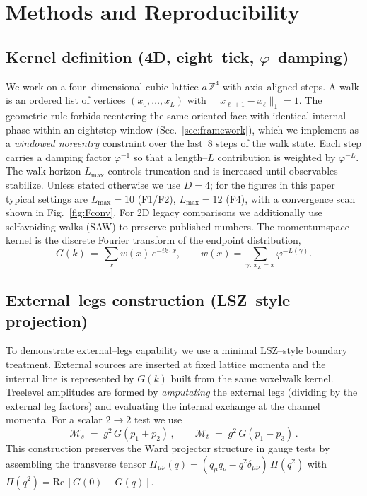 \documentclass[11pt,a4paper]{article}
\theoremstyle{definition}
\theoremstyle{remark}
\begin{document}
\section{Methods and Reproducibility}
\label{sec:methods}

\subsection{Kernel definition (4D, eight--tick, $\varphi$--damping)}
We work on a four--dimensional cubic lattice $a\,\mathbb Z^{4}$ with axis--aligned steps. A walk is an ordered list of vertices $(x_0,\dots,x_L)$ with $\|x_{\ell+1}-x_{\ell}\|_1=1$. The geometric rule forbids re\-entering the same oriented face with identical internal phase within an eight\-step window (Sec.~\ref{sec:framework}), which we implement as a \emph{windowed no\-reentry} constraint over the last~8 steps of the walk state. Each step carries a damping factor $\varphi^{-1}$ so that a length--$L$ contribution is weighted by $\varphi^{-L}$. The walk horizon $L_{\max}$ controls truncation and is increased until observables stabilize. Unless stated otherwise we use $D{=}4$; for the figures in this paper typical settings are $L_{\max}{=}10$ (F1/F2), $L_{\max}{=}12$ (F4), with a convergence scan shown in Fig.~\ref{fig:Fconv}. For 2D legacy comparisons we additionally use self\-avoiding walks (SAW) to preserve published numbers. The momentum\-space kernel is the discrete Fourier transform of the endpoint distribution,
\[
  G(k) \,=\, \sum_{x} w(x)\,e^{-i k\cdot x},\qquad w(x)=\sum_{\gamma:\,x_L=x}\varphi^{-L(\gamma)} .
\]

\subsection{External--legs construction (LSZ--style projection)}
To demonstrate external--legs capability we use a minimal LSZ--style boundary treatment. External sources are inserted at fixed lattice momenta and the internal line is represented by $G(k)$ built from the same voxel\-walk kernel. Tree\-level amplitudes are formed by \emph{amputating} the external legs (dividing by the external leg factors) and evaluating the internal exchange at the channel momenta. For a scalar 2$\to$2 test we use
\[
  \mathcal M_s \;=\; g^2\,G(p_1\!+\!p_2)\,,\qquad
  \mathcal M_t \;=\; g^2\,G(p_1\!-
  \!p_3)\,.
\]
This construction preserves the Ward projector structure in gauge tests by assembling the transverse tensor $\Pi_{\mu\nu}(q)=(q_\mu q_\nu- q^2\delta_{\mu\nu})\,\Pi(q^2)$ with $\Pi(q^2)=\mathrm{Re}\,[G(0)-G(q)]$.
\end{document}
